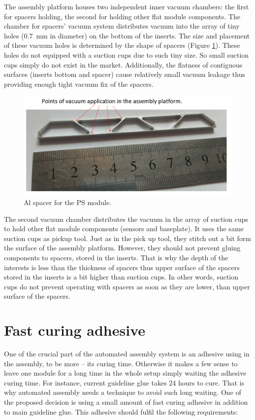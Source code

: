 The assembly platform houses two independent inner vacuum chambers: the first for spacers holding, the second for holding other flat module components. The chamber for spacers' vacuum system distributes vacuum into the array of tiny holes (0.7~mm in diameter) on the bottom of the inserts. The size and placement of these vacuum holes is determined by the shape of spacers (Figure \ref{fig:al_spacer}). These holes do not equipped with a suction cups due to such tiny size. So small suction cups simply do not exist in the market. Additionally, the flatness of contiguous surfaces (inserts bottom and spacer) cause relatively small vacuum leakage thus providing enough tight vacuum fix of the spacers.

\begin{figure}[ht]\centering
\includegraphics[width=0.7\linewidth]{Data/Module_assembly/Al_spacer.png}
\caption{Al spacer for the PS module.}
\label{fig:al_spacer}
\end{figure}

The second vacuum chamber distributes the vacuum in the array of suction cups to hold other flat module components (sensors and baseplate). It uses the same suction cups as pickup tool. Just as in the pick up tool, they stitch out a bit form the surface of the assembly platform. However, they should not prevent gluing components to spacers, stored in the inserts. That is why the depth of the interests is less than the thickness of spacers thus upper surface of the spacers stored in the inserts is a bit higher than suction cups. In other words, suction cups do not prevent operating with spacers as soon as they are lower, than upper surface of the spacers.

\section{Fast curing adhesive}

One of the crucial part of the automated assembly system is an adhesive using in the assembly, to be more  -- its curing time. Otherwise it makes a few sense to leave one module for a long time in the whole setup simply waiting the adhesive curing time. For instance, current guideline glue takes 24 hours to cure. That is why automated assembly needs a technique to avoid such long waiting. One of the proposed decision is using a small amount of fast curing adhesive in addition to main guideline glue. This adhesive should fulfil the following requirements:

